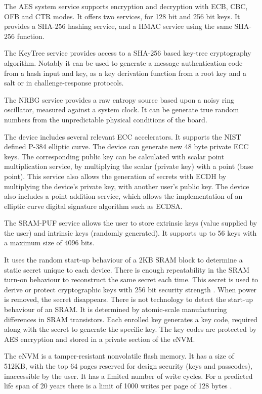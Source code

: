 The \ac{AES} system service supports encryption and decryption with ECB, CBC, OFB and CTR modes. It offers two services, for 128 bit and 256 bit keys.
It provides a \ac{SHA}-256 hashing service, and a \ac{HMAC} service using the same \ac{SHA}-256 function.

The KeyTree service provides access to a SHA-256 based key-tree cryptography algorithm. Notably it can be used to generate a message authentication code from a hash input and key, as a key derivation function from a root key and a salt or in challenge-response protocols.

The \ac{NRBG} service provides a raw entropy source based upon a noisy ring oscillator, measured against a system clock. It can be generate true random numbers from the unpredictable physical conditions of the board.

The device includes several relevant \ac{ECC} accelerators. It supports the \ac{NIST} defined P-384 elliptic curve.
The device can generate new 48 byte private \ac{ECC} keys. The corresponding public key can be calculated with scalar point multiplication service, by multiplying the scalar (private key) with a point (base point). This service also allows the generation of secrets with \ac{ECDH} by multiplying the device's private key, with another user's public key.
The device also includes a point addition service, which allows the implementation of an elliptic curve digital signature algorithm such as ECDSA.

The SRAM-PUF service allows the user to store extrinsic keys (value supplied by the user) and intrinsic keys (randomly generated).
It supports up to 56 keys with a maximum size of 4096 bits.

It uses the random start-up behaviour of a 2KB \ac{SRAM} block to determine a static secret unique to each device. There is enough repeatability in the SRAM turn-on behaviour to reconstruct the same secret each time. This secret is used to derive or protect cryptographic keys with 256 bit security strength \cite{smartfusionSecurityPractices}.
When power is removed, the secret disappears. There is not technology to detect the start-up behaviour of an SRAM. It is determined by atomic-scale manufacturing differences in SRAM transistors.
Each enrolled key generates a key code, required along with the secret to generate the specific key.
The key codes are protected by \ac{AES} encryption and stored in a private section of the eNVM.

The eNVM is a tamper-resistant nonvolatile flash memory. It has a size of 512KB, with the top 64 pages reserved for design security (keys and passcodes), inaccessible by the user.
It has a limited number of write cycles. For a predicted life span of 20 years there is a limit of 1000 writes per page of 128 bytes \cite{smartfusionDatasheet}.

